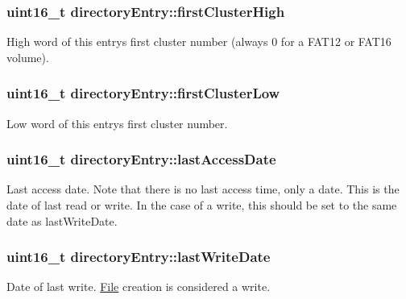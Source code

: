 \subsubsection[{first\+Cluster\+High}]{\setlength{\rightskip}{0pt plus 5cm}uint16\+\_\+t directory\+Entry\+::first\+Cluster\+High}\label{structdirectory_entry_a3b492598b2b05e8425d2a500443613bd}
High word of this entry\textquotesingle{}s first cluster number (always 0 for a F\+A\+T12 or F\+A\+T16 volume). \hypertarget{structdirectory_entry_a74bd660417a9c3501eae353326c14bb9}{}
\subsubsection[{first\+Cluster\+Low}]{\setlength{\rightskip}{0pt plus 5cm}uint16\+\_\+t directory\+Entry\+::first\+Cluster\+Low}\label{structdirectory_entry_a74bd660417a9c3501eae353326c14bb9}
Low word of this entry\textquotesingle{}s first cluster number. \hypertarget{structdirectory_entry_abca70dc5c5fcbe199fd78df010111331}{}
\subsubsection[{last\+Access\+Date}]{\setlength{\rightskip}{0pt plus 5cm}uint16\+\_\+t directory\+Entry\+::last\+Access\+Date}\label{structdirectory_entry_abca70dc5c5fcbe199fd78df010111331}
Last access date. Note that there is no last access time, only a date. This is the date of last read or write. In the case of a write, this should be set to the same date as last\+Write\+Date. \hypertarget{structdirectory_entry_a12b2e7cf87482a942a0b5d3df6c51468}{}
\subsubsection[{last\+Write\+Date}]{\setlength{\rightskip}{0pt plus 5cm}uint16\+\_\+t directory\+Entry\+::last\+Write\+Date}\label{structdirectory_entry_a12b2e7cf87482a942a0b5d3df6c51468}
Date of last write. \hyperlink{class_file}{File} creation is considered a write. \hypertarget{structdirectory_entry_a7bab435322d1928f66fbce53ee1f402d}{}
